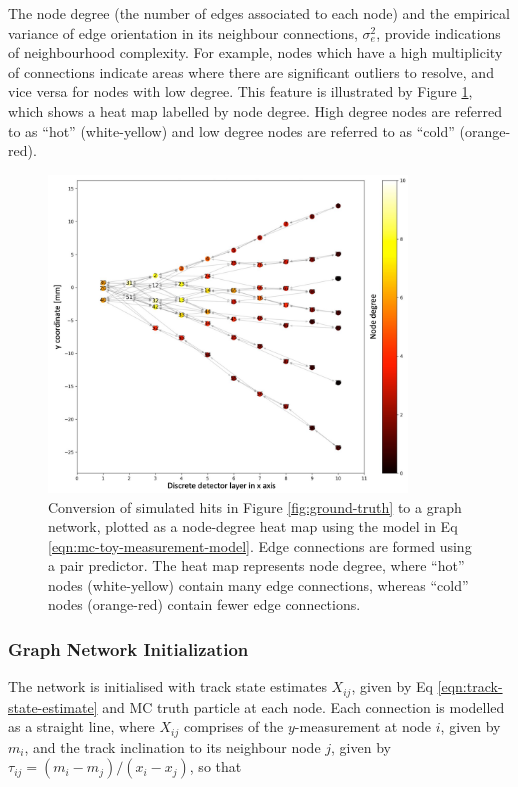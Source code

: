 The node degree (the number of edges associated to each node) and the empirical variance of edge orientation in its neighbour connections, $\sigma_{e}^{2}$, provide indications of neighbourhood complexity. For example, nodes which have a high multiplicity of connections indicate areas where there are significant outliers to resolve, and vice versa for nodes with low degree. This feature is illustrated by Figure \ref{fig:heat-map}, which shows a heat map labelled by node degree. High degree nodes are referred to as ``hot'' (white-yellow) and low degree nodes are referred to as ``cold'' (orange-red).


\begin{figure}[htbp]
    \centering
    \includegraphics[width=0.85\textwidth]{images/5-gnn-algorithm/heatmap-network.png}
    \caption{Conversion of simulated hits in Figure \ref{fig:ground-truth} to a graph network, plotted as a node-degree heat map using the model in Eq \eqref{eqn:mc-toy-measurement-model}. Edge connections are formed using a pair predictor. The heat map represents node degree, where ``hot'' nodes (white-yellow) contain many edge connections, whereas ``cold'' nodes (orange-red) contain fewer edge connections.}
    \label{fig:heat-map}%
\end{figure}


\subsubsection{Graph Network Initialization}

The network is initialised with track state estimates $X_{ij}$, given by Eq \eqref{eqn:track-state-estimate} and MC truth particle at each node. Each connection is modelled as a straight line, where $X_{ij}$ comprises of the $y$-measurement at node $i$, given by $m_i$, and the track inclination to its neighbour node $j$, given by $\tau_{ij} = (m_i - m_j) / (x_i - x_j)$, so that

